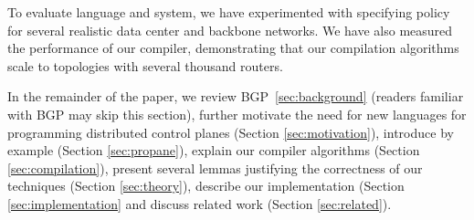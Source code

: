 To evaluate language and system, we have experimented with specifying policy
for several realistic data center and backbone networks. We have also
measured the performance of our compiler, demonstrating that our compilation
algorithms scale to topologies with several thousand routers.

In the remainder of the paper, we review BGP~\ref{sec:background} (readers
familiar with BGP may skip this section),
further motivate the need for new languages 
for programming distributed control planes (Section \ref{sec:motivation}),
introduce \sysname{} by example (Section \ref{sec:propane}), 
explain our compiler algorithms (Section \ref{sec:compilation}),
present several lemmas justifying the correctness of our techniques (Section \ref{sec:theory}), describe our implementation (Section \ref{sec:implementation}
and discuss related work (Section \ref{sec:related}).




